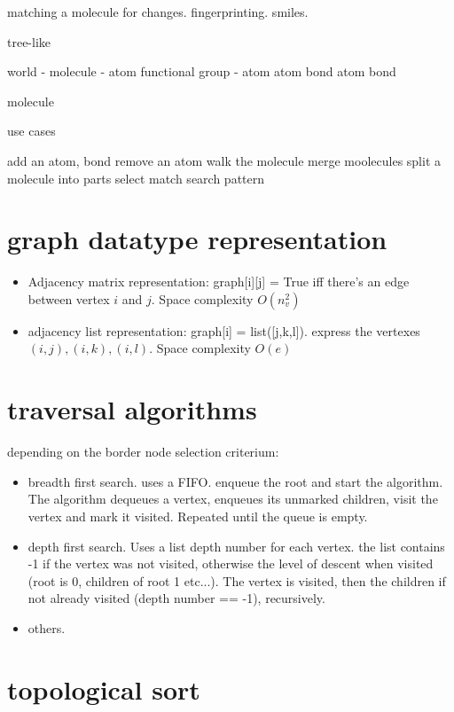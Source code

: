 matching a molecule for changes. fingerprinting. smiles.


tree-like

world - molecule - atom
                   functional group - atom
                                      atom
                                      bond
                   atom
                   bond
        
        molecule

use cases

add an atom, bond
remove an atom
walk the molecule
merge moolecules
split a molecule into parts
select
match search pattern



\section{graph datatype representation}
\begin{itemize}
\item Adjacency matrix representation: graph[i][j] = True iff there's an
edge between vertex $i$ and $j$. Space complexity $O(n_{v}^2)$
\item adjacency list representation: graph[i] = list([j,k,l]). express the
vertexes $(i,j), (i,k), (i,l)$. Space complexity $O(e)$
\end{itemize}

\section{traversal algorithms}

depending on the border node selection criterium:
\begin{itemize}
\item breadth first search. uses a FIFO. enqueue the root and start the
algorithm. The algorithm dequeues a vertex, enqueues its unmarked children,
visit the vertex and mark it visited. Repeated until the queue is empty.
\item depth first search. Uses a list depth number for each vertex. the list
contains -1 if the vertex was not visited, otherwise the level of descent
when visited (root is 0, children of root 1 etc...). The vertex is visited,
then the children if not already visited (depth number == -1), recursively.
\item others.
\end{itemize}

\section{topological sort}


